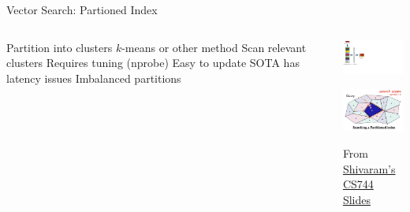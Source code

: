 \placelogofalse
\begin{frame}{Vector Search: Partioned Index}
\begin{columns}
\centering
\begin{outline}
  \1 Partition into clusters
  \2 $k$-means or other method
  \1 Scan relevant clusters
  \2 Requires tuning (nprobe)
  \1 Easy to update
  \1 SOTA has latency issues
  \1 Imbalanced partitions
\end{outline}

\begin{center}
\centering
\includegraphics[width=4.0cm, page=2, trim={0 7.5cm 21cm 0cm},clip]{assets/vec_db_figs.pdf}

\vspace{0.3cm}

\includegraphics[width=4.5cm]{assets/partition_fig.png}

{\tiny From \href{https://pages.cs.wisc.edu/~shivaram/cs744-sp25-slides/cs744-analyticdb-v.pdf}{Shivaram's CS744 Slides}}

\end{center}
\end{columns}
\end{frame}
\placelogotrue
